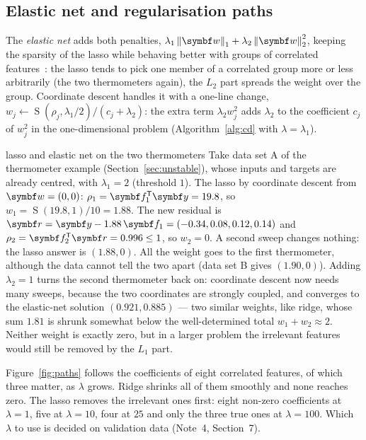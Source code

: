 \documentclass[11pt]{article}
\newcommand{\w}{\vect{w}}
\newcommand{\y}{\vect{y}}
\newcommand{\soft}{\operatorname{S}}
\newcommand{\vr}{\vect{r}}
\begin{document}
\subsection{Elastic net and regularisation paths}\label{sec:paths}

The \emph{elastic net} adds both penalties, $\lambda_1\norm{\w}_1 + \lambda_2\norm{\w}_2^2$, keeping the sparsity of the
lasso while behaving better with groups of correlated features~\cite{zou2005}: the lasso tends to pick one member of a
correlated group more or less arbitrarily (the two thermometers again), the $L_2$ part spreads the weight over the
group. Coordinate descent handles it with a one-line change, $w_j \leftarrow \soft(\rho_j, \lambda_1/2)/(c_j + \lambda_2)$:
the extra term $\lambda_2 w_j^2$ adds $\lambda_2$ to the coefficient $c_j$ of $w_j^2$ in the one-dimensional problem
(Algorithm~\ref{alg:cd} with $\lambda = \lambda_1$).

\begin{worked}{lasso and elastic net on the two thermometers}
Take data set A of the thermometer example (Section~\ref{sec:unstable}), whose inputs and targets are already centred,
with $\lambda_1 = 2$ (threshold $1$). The lasso by coordinate descent from $\w = (0, 0)$: $\rho_1 = \vect{f}_1\T\y = 19.8$,
so $w_1 = \soft(19.8, 1)/10 = 1.88$. The new residual is $\vr = \y - 1.88\,\vect{f}_1 = (-0.34, 0.08, 0.12, 0.14)$ and
$\rho_2 = \vect{f}_2\T\vr = 0.996 \le 1$, so $w_2 = 0$. A second sweep changes nothing: the lasso answer is $(1.88, 0)$.
All the weight goes to the first thermometer, although the data cannot tell the two apart (data set B gives $(1.90, 0)$).
Adding $\lambda_2 = 1$ turns the second thermometer back on: coordinate descent now needs many sweeps, because the two
coordinates are strongly coupled, and converges to the elastic-net solution $(0.921, 0.885)$ --- two similar weights,
like ridge, whose sum $1.81$ is shrunk somewhat below the well-determined total $w_1 + w_2 \approx 2$. Neither weight is exactly zero, but in a
larger problem the irrelevant features would still be removed by the $L_1$ part.
\end{worked}

Figure~\ref{fig:paths} follows the coefficients of eight correlated features, of which three matter, as $\lambda$ grows.
Ridge shrinks all of them smoothly and none reaches zero. The lasso removes the irrelevant ones first: eight non-zero
coefficients at $\lambda = 1$, five at $\lambda = 10$, four at $25$ and only the three true ones at $\lambda = 100$. Which
$\lambda$ to use is decided on validation data (Note~4, Section~7).
\end{document}
